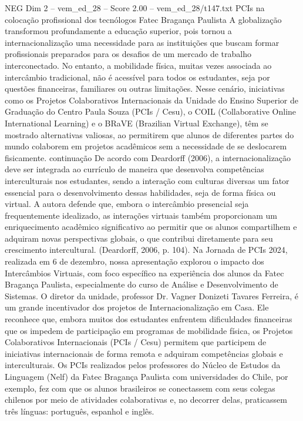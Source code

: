 \begin{textsample}{NEG Dim 2 – vem\_ed\_28 – Score 2.00 – vem\_ed\_28/t147.txt}  \label{ex:f2_neg_057}
PCIs na colocação profissional dos tecnólogos Fatec Bragança Paulista A globalização transformou profundamente a educação superior, pois tornou a internacionalização uma necessidade para as instituições que buscam formar profissionais preparados para os desafios de um mercado de trabalho interconectado.
No entanto, a mobilidade física, muitas vezes associada ao intercâmbio tradicional, não é acessível para todos os estudantes, seja por questões financeiras, familiares ou outras limitações.
Nesse cenário, iniciativas como os Projetos Colaborativos Internacionais da Unidade do Ensino Superior de Graduação do Centro Paula Souza (PCIs / Cesu), o COIL (Collaborative Online International Learning) e o BRaVE (Brazilian Virtual Exchange), têm se mostrado alternativas valiosas, ao permitirem que alunos de diferentes partes do mundo colaborem em projetos acadêmicos sem a necessidade de se deslocarem fisicamente. continuação De acordo com Deardorff (2006), a internacionalização deve ser integrada ao currículo de maneira que desenvolva competências interculturais nos estudantes, sendo a interação com culturas diversas um fator essencial para o desenvolvimento dessas habilidades, seja de forma física ou virtual.
A autora defende que, embora o intercâmbio presencial seja frequentemente idealizado, as interações virtuais também proporcionam um enriquecimento acadêmico significativo ao permitir que os alunos compartilhem e adquiram novas perspectivas globais, o que contribui diretamente para seu crescimento intercultural. (Deardorff, 2006, p. 104).
Na Jornada de PCIs 2024, realizada em 6 de dezembro, nossa apresentação explorou o impacto dos Intercâmbios Virtuais, com foco específico na experiência dos alunos da Fatec Bragança Paulista, especialmente do curso de Análise e Desenvolvimento de Sistemas.
O diretor da unidade, professor Dr.
Vagner Donizeti Tavares Ferreira, é um grande incentivador dos projetos de Internacionalização em Casa.
Ele reconhece que, embora muitos dos estudantes enfrentem dificuldades financeiras que os impedem de participação em programas de mobilidade física, os Projetos Colaborativos Internacionais (PCIs / Cesu) permitem que participem de iniciativas internacionais de forma remota e adquiram competências globais e interculturais.
Os PCIs realizados pelos professores do Núcleo de Estudos da Linguagem (Nelf) da Fatec Bragança Paulista com universidades do Chile, por exemplo, fez com que os alunos brasileiros se conectassem com seus colegas chilenos por meio de atividades colaborativas e, no decorrer delas, praticassem três línguas: português, espanhol e inglês.

\end{textsample}
